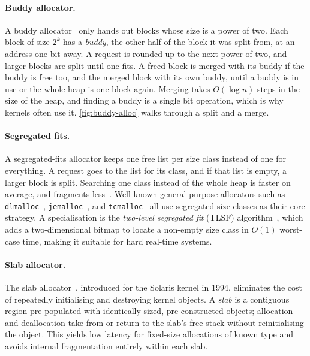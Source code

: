 \documentclass[12pt]{report}
\renewcommand{\_}{\origunderscore\allowbreak}
\begin{document}
\paragraph{Buddy allocator.} A buddy allocator~\cite{knowlton1965,knuth1968taocp} only hands out blocks whose size is a power of two. Each block of size $2^k$ has a \emph{buddy}, the other half of the block it was split from, at an address one bit away. A request is rounded up to the next power of two, and larger blocks are split until one fits. A freed block is merged with its buddy if the buddy is free too, and the merged block with its own buddy, until a buddy is in use or the whole heap is one block again. Merging takes $O(\log n)$ steps in the size of the heap, and finding a buddy is a single bit operation, which is why kernels often use it. \cref{fig:buddy-alloc} walks through a split and a merge.



\paragraph{Segregated fits.} A segregated-fits allocator keeps one free list per size class instead of one for everything. A request goes to the list for its class, and if that list is empty, a larger block is split. Searching one class instead of the whole heap is faster on average, and fragments less~\cite{wilson1995survey}. Well-known general-purpose allocators such as \texttt{dlmalloc}~\cite{lea1996malloc}, \texttt{jemalloc}~\cite{evans2006jemalloc}, and \texttt{tcmalloc}~\cite{ghemawat2023tcmalloc} all use segregated size classes as their core strategy. A specialisation is the \emph{two-level segregated fit} (TLSF) algorithm~\cite{masmano2004tlsf}, which adds a two-dimensional bitmap to locate a non-empty size class in $O(1)$ worst-case time, making it suitable for hard real-time systems.

\paragraph{Slab allocator.} The slab allocator~\cite{bonwick1994slab}, introduced for the Solaris kernel in 1994, eliminates the cost of repeatedly initialising and destroying kernel objects. A \emph{slab} is a contiguous region pre-populated with identically-sized, pre-constructed objects; allocation and deallocation take from or return to the slab's free stack without reinitialising the object. This yields low latency for fixed-size allocations of known type and avoids internal fragmentation entirely within each slab.
\end{document}
